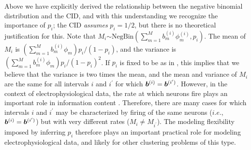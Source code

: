 \documentclass[journal]{IEEEtran}
\begin{document}
Above we have explicitly derived the relationship between the negative binomial distribution and the CID, and with this understanding we recognize the importance of $p_i$; the CID \emph{assumes} $p_i=1/2$, but there is no theoretical justification for this. Note that  $M_i$$\sim\mbox{NegBin}(\sum_{m=1}^M b_m^{(i)}{\phi}_m^{(i)},p_i)$. The mean of $M_i$ is $(\sum_{m=1}^M b_m^{(i)}{\phi}_m) p_i/(1-p_i)$, and the variance is $(\sum_{m=1}^M b_m^{(i)}{\phi}_m)p_i/(1-p_i)^2$. If $p_i$ is fixed to be   as in \cite{compound}, this implies that we believe that the variance is two times the mean, and the mean and variance of $M_i$ are the same for all intervals $i$ and $i^\prime$ for which $\boldsymbol{b}^{(i)}=\boldsymbol{b}^{(i^\prime)}$. However, in the context of electrophysiological data, the rate at which neurons fire plays an important role in information content \cite{Donoghue07}. Therefore, there are many cases for which intervals $i$ and $i^\prime$ may be characterized by firing of the same neurons ($i.e.$, $\boldsymbol{b}^{(i)}=\boldsymbol{b}^{(i^\prime)}$) but with very different rates ($M_i\neq M_{i^\prime}$). The modeling flexibility imposed by inferring $p_i$ therefore plays an important practical role for modeling electrophysiological data, and likely for other clustering problems of this type.
\end{document}
